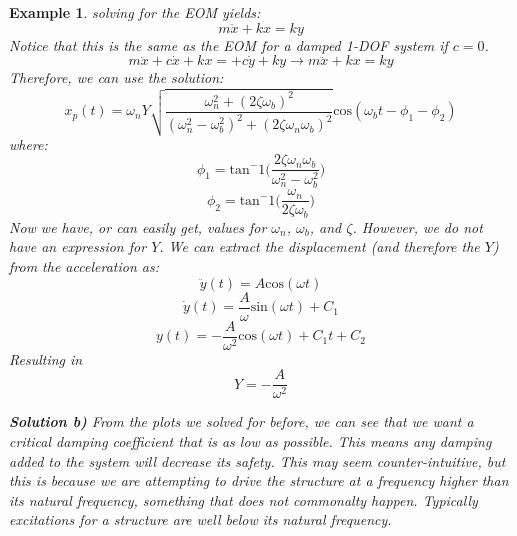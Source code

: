 \documentclass[12pt,letter]{article}
\newtheorem{ex}{Example}
\numberwithin{ex}{section} %
\newenvironment{example}{\begin{mdframed}[middlelinewidth=0.5mm]\begin{ex}\normalfont}{\end{ex}\end{mdframed}}
\begin{document}
\begin{example}
			solving for the EOM yields:
			\begin{equation}
				m\ddot{x} + kx = ky
			\end{equation} 				
			Notice that this is the same as the EOM for a damped 1-DOF system if $c=0$.	
			\begin{equation}
			m\ddot{x} + c\dot{x} + kx = + c\dot{y} + ky \rightarrow m\ddot{x} + kx = ky
			\end{equation}
			Therefore, we can use the solution:
			\begin{equation}
				x_p(t) = 	\omega_n Y   \sqrt{\frac{\omega_n^2 + (2 \zeta \omega_b)^2 }{(\omega_n^2 - \omega_b^2)^2 +  (2\zeta \omega_n \omega_b)^2} }  \text{cos}(\omega_bt - \phi_1 - \phi_2)
			\end{equation}
			where:
			\begin{equation}
				\phi_1 = \text{tan}^-1\bigg(\frac{2\zeta \omega_n \omega_b}{\omega_n^2 - \omega_b^2}\bigg)
			\end{equation}	
			\begin{equation}
				\phi_2 = \text{tan}^-1\bigg(\frac{\omega_n}{2\zeta \omega_b}\bigg)
			\end{equation}
			Now we have, or can easily get, values for $\omega_n$, $\omega_b$, and $\zeta$. However, we do not have an expression for $Y$. We can extract the displacement (and therefore the $Y$) from the acceleration as:
			\begin{equation}
				\ddot{y}(t) = A \text{cos}(\omega t)
			\end{equation} 				
			\begin{equation}
				\dot{y}(t) = \frac{A}{\omega} \text{sin}(\omega t) + C_1
			\end{equation} 					
			\begin{equation}
				y(t) = - \frac{A}{\omega^2} \text{cos}(\omega t) + C_1t + C_2
			\end{equation} 					
			Resulting in 
			\begin{equation}
				Y = -\frac{A}{\omega^2}
			\end{equation} 			
			
			\textbf{Solution b)}
			From the plots we solved for before, we can see that we want a critical damping coefficient that is as low as possible. This means any damping added to the system will decrease its safety. This may seem counter-intuitive, but this is because we are attempting to drive the structure at a frequency higher than its natural frequency, something that does not commonalty happen. Typically excitations for a structure are well below its natural frequency.  			
			
\end{example}			
	
\end{document}
